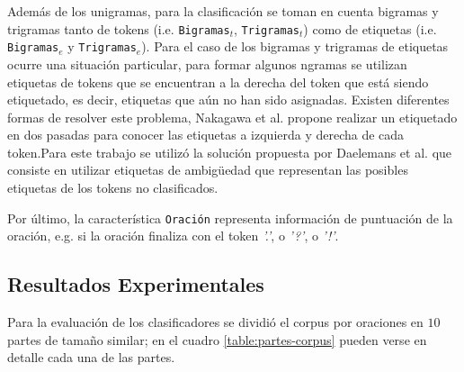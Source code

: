 \documentclass[runningheads,a4paper]{llncs}
\begin{document}
Adem\'as de los unigramas, para la clasificaci\'on se toman en cuenta bigramas y trigramas tanto de tokens (i.e. \texttt{\small Bigramas$_{t}$}, \texttt{\small Trigramas$_{t}$}) como de etiquetas (i.e. \texttt{\small Bigramas$_{e}$} y \texttt{\small Trigramas$_{e}$}). Para el caso de los bigramas y trigramas de etiquetas ocurre una situaci\'on particular, para formar algunos ngramas se utilizan etiquetas de tokens que se encuentran a la derecha del token que está siendo etiquetado, es decir, etiquetas que aún no han sido asignadas. Existen diferentes formas de resolver este problema, Nakagawa et al.\cite{NAKAGAWA01} propone realizar un etiquetado en dos pasadas para conocer las etiquetas a izquierda y derecha de cada token.Para este trabajo se utilizó la solución propuesta por Daelemans et al.\cite{DAELEMANS96} que consiste en utilizar etiquetas de ambig\"uedad que representan las posibles etiquetas de los tokens no clasificados.

Por último, la caracter\'istica \texttt{\small Oraci\'on} representa información de puntuación de la oración, e.g. si la oración finaliza con el token \emph{'.'}, o \emph{'?'}, o \emph{'!'}.



\subsection{Resultados Experimentales}
Para la evaluación de los clasificadores se dividió el corpus por oraciones en $10$ partes de tamaño similar; en el cuadro \ref{table:partes-corpus} pueden verse en detalle cada una de las partes. 
\end{document}
